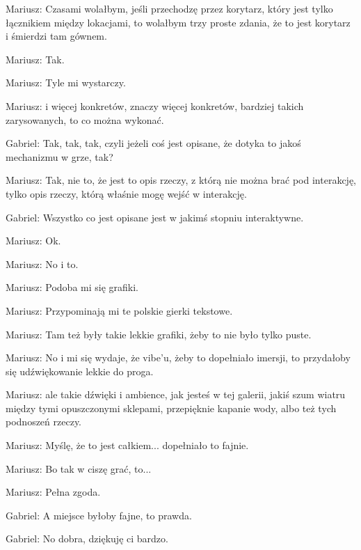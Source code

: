 Mariusz: Czasami wolałbym, jeśli przechodzę przez korytarz, który jest tylko łącznikiem między lokacjami, to wolałbym trzy proste zdania, że to jest korytarz i śmierdzi tam gównem.

Mariusz: Tak.

Mariusz: Tyle mi wystarczy.

Mariusz: i więcej konkretów, znaczy więcej konkretów, bardziej takich zarysowanych, to co można wykonać.

Gabriel: Tak, tak, tak, czyli jeżeli coś jest opisane, że dotyka to jakoś mechanizmu w grze, tak?

Mariusz: Tak, nie to, że jest to opis rzeczy, z którą nie można brać pod interakcję, tylko opis rzeczy, którą właśnie mogę wejść w interakcję.

Gabriel: Wszystko co jest opisane jest w jakimś stopniu interaktywne.

Mariusz: Ok.

Mariusz: No i to.

Mariusz: Podoba mi się grafiki.

Mariusz: Przypominają mi te polskie gierki tekstowe.

Mariusz: Tam też były takie lekkie grafiki, żeby to nie było tylko puste.

Mariusz: No i mi się wydaje, że vibe'u, żeby to dopełniało imersji, to przydałoby się udźwiękowanie lekkie do proga.

Mariusz: ale takie dźwięki i ambience, jak jesteś w tej galerii, jakiś szum wiatru między tymi opuszczonymi sklepami, przepięknie kapanie wody, albo też tych podnoszeń rzeczy.

Mariusz: Myślę, że to jest całkiem... dopełniało to fajnie.

Mariusz: Bo tak w ciszę grać, to...

Mariusz: Pełna zgoda.

Gabriel: A miejsce byłoby fajne, to prawda.

Gabriel: No dobra, dziękuję ci bardzo.



